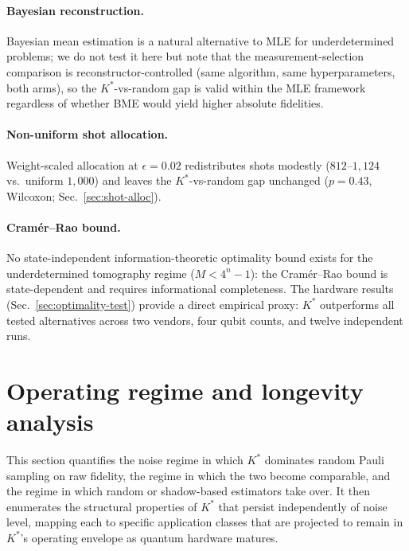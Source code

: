 \documentclass[twocolumn,prx,aps,superscriptaddress,longbibliography]{revtex4-2}
\begin{document}
\paragraph{Bayesian reconstruction.}
Bayesian mean estimation is a natural alternative to MLE for
underdetermined problems; we do not test it here but note that the
measurement-selection comparison is reconstructor-controlled
(same algorithm, same hyperparameters, both arms), so the
$K^*$-vs-random gap is valid within the MLE framework regardless of
whether BME would yield higher absolute fidelities.

\paragraph{Non-uniform shot allocation.}
Weight-scaled allocation at $\epsilon = 0.02$ redistributes shots
modestly ($812$--$1{,}124$ vs.\ uniform $1{,}000$) and leaves
the $K^*$-vs-random gap unchanged ($p = 0.43$, Wilcoxon;
Sec.~\ref{sec:shot-alloc}).

\paragraph{Cramér--Rao bound.}
No state-independent information-theoretic optimality bound exists for
the underdetermined tomography regime ($M < 4^n - 1$): the
Cramér--Rao bound is state-dependent and requires informational
completeness.  The hardware results
(Sec.~\ref{sec:optimality-test}) provide a direct empirical proxy:
$K^*$ outperforms all tested alternatives across two vendors, four
qubit counts, and twelve independent runs.



\section{Operating regime and longevity analysis}
\label{sm:longevity}

This section quantifies the noise regime in which $K^*$ dominates
random Pauli sampling on raw fidelity, the regime in which the two
become comparable, and the regime in which random or shadow-based
estimators take over.  It then enumerates the structural
properties of $K^*$ that persist independently of noise level,
mapping each to specific application classes that are projected
to remain in $K^*$'s operating envelope as quantum hardware matures.
\end{document}
